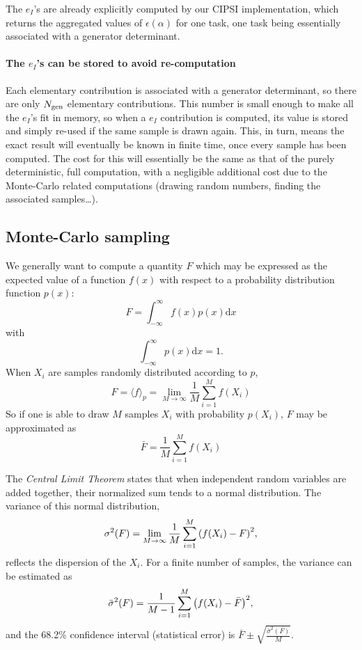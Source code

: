 \documentclass[./thesis.tex]{subfiles}
\begin{document}
The $e_I$'s are already explicitly computed by our CIPSI implementation, which returns the aggregated values of $\epsilon(\alpha)$ for one task, one task being essentially associated with a generator determinant.

\paragraph{The $e_I$'s can be stored to avoid re-computation}
Each elementary contribution is associated with a generator determinant, so there are only ${N_\text{gen}}$ elementary contributions. This number is small enough to make all the $e_I$'s fit in memory, so when a $e_I$ contribution is computed, its value is stored and simply re-used if the same sample is drawn again. This, in turn, means the exact result will eventually be known in finite time, once every sample has been computed. The cost for this will essentially be the same as that of the purely deterministic, full computation, with a negligible additional cost due to the Monte-Carlo related computations (drawing random numbers, finding the associated samples\dots).

\subsection{Monte-Carlo sampling}

We generally want to compute a quantity $F$ which may be expressed as the expected value of a function $f(x)$ with respect to a probability distribution function $p(x)$:
\begin{equation}
F = \int_{-\infty}^\infty f(x) p(x) \text{d} x
\end{equation}
with 
\begin{equation}
\int_{-\infty}^\infty p(x) \text{d} x = 1.
\end{equation}
When $X_i$ are samples randomly distributed according to $p$, 
\begin{equation}
\label{eq:sum_mc}
F = \langle f \rangle_p =  \lim_{M\rightarrow \infty} \frac{1}{M} \sum_{i=1}^{M} f(X_i)
\end{equation}
So if one is able to draw $M$ samples $X_i$ with probability $p(X_i)$, $F$ may be approximated as
\begin{equation}
\bar{F} = \frac{1}{M} \sum_{i=1}^{M} f(X_i)
\end{equation}

The \emph{Central Limit Theorem} states that when independent random variables are added together, their normalized sum tends to a normal distribution. The variance of this normal distribution, 
\begin{equation}
\sigma^2(F) = \lim_{M\rightarrow \infty} \frac{1}{M} \sum_{i=1}^{M} \qty( f(X_i) - F)^2,
\end{equation}
reflects the dispersion of the $X_i$.
For a finite number of samples, the variance can be estimated as
\begin{equation}
\bar{\sigma}^2(F) = \frac{1}{M-1} \sum_{i=1}^{M} \qty( f(X_i) - \bar{F})^2,
\end{equation}
and the 68.2\% confidence interval (statistical error) is $\bar{F} \pm \sqrt{\frac{\bar{\sigma}^2(F)}{M}}$.
\end{document}
